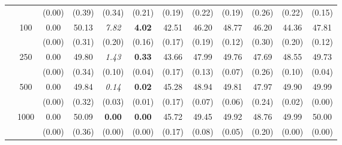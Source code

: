\documentclass[twoside]{article}
\newcommand{\0}{\mathbf{0}}
\newcommand{\1}{\mathbf{1}}
\numberwithin{equation}{section}
\begin{document}
\begin{table}[t]
\begin{tabular}{|c|c|c|c|c|c|c|c|c|c|c|c|}
    &  & (0.00)    & (0.39)                   & (0.34)                   & (0.21)                   & (0.19) & (0.22) & (0.19) & (0.26) & (0.22) & (0.15) \\ \cline{2-12}
    & \multirow{2}{*}{100}  & 0.00     & 50.13                    & {\it 7.82}                     & {\bf 4.02}                     & 42.51  & 46.20   & 48.77  & 46.20   & 44.36  & 47.81  \\
    &  & (0.00)    & (0.31)                   & (0.20)                    & (0.16)                   & (0.17) & (0.19) & (0.12) & (0.30)  & (0.20)  & (0.12) \\ \cline{2-12}
    & \multirow{2}{*}{250}  & 0.00     & 49.80                     & {\it 1.43}                     & {\bf 0.33}                     & 43.66  & 47.99  & 49.76  & 47.69  & 48.55  & 49.73  \\
    &  & (0.00)    & (0.34)                   & (0.10)                    & (0.04)                   & (0.17) & (0.13) & (0.07) & (0.26) & (0.10)  & (0.04) \\ \cline{2-12}
    & \multirow{2}{*}{500}  & 0.00     & 49.84                    & {\it 0.14}                     & {\bf 0.02}                     & 45.28  & 48.94  & 49.81  & 47.97  & 49.90   & 49.99  \\
    &  & (0.00)    & (0.32)                   & (0.03)                   & (0.01)                   & (0.17) & (0.07) & (0.06) & (0.24) & (0.02) & (0.00)    \\ \cline{2-12}
    & \multirow{2}{*}{1000} & 0.00     & 50.09                    & {\bf 0.00}                        & {\bf 0.00}                        & 45.72  & 49.45  & 49.92  & 48.76  & 49.99  & 50.00     \\
    &  & (0.00)    & (0.36)                   & (0.00)                      & (0.00)                      & (0.17) & (0.08) & (0.05) & (0.20)  & (0.00)    & (0.00)\\ \hline
\end{tabular}
\vspace{-0.1in}
\end{table}%
\end{document}
